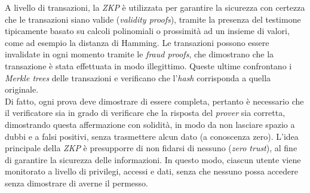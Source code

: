 A livello di transazioni, la \textit{ZKP} è utilizzata per garantire la sicurezza con certezza che le transazioni siano valide (\textit{validity proofs}), tramite la presenza del testimone tipicamente basato su calcoli polinomiali o
prossimità ad un insieme di valori, come ad esempio la distanza di Hamming. Le transazioni possono essere invalidate in ogni momento tramite le \textit{fraud proofs}, che dimostrano che la transazione è stata effettuata in modo illegittimo.
Queste ultime confrontano i \textit{Merkle trees} delle transazioni e verificano che l'\textit{hash} corrisponda a quella originale. \\

Di fatto, ogni prova deve dimostrare di essere completa, pertanto è necessario che il verificatore sia in grado di verificare che la risposta del \textit{prover} sia corretta,
dimostrando questa affermazione con solidità, in modo da non lasciare spazio a dubbi e a falsi positivi, senza trasmettere alcun dato (a conoscenza zero).
L'idea principale della \textit{ZKP} è presupporre di non fidarsi di nessuno (\textit{zero trust}), al fine di garantire la sicurezza delle informazioni. 
In questo modo, ciascun utente viene monitorato a livello di privilegi, accessi e dati, senza che nessuno possa accedere senza dimostrare di averne il permesso. \\

